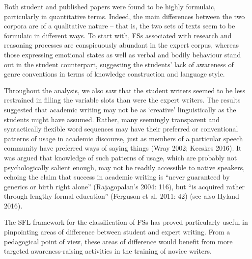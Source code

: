 \begin{styleStandard}
Both student and published papers were found to be highly formulaic, particularly in quantitative terms. Indeed, the main differences between the two corpora are of a qualitative nature – that is, the two sets of texts seem to be formulaic in different ways. To start with, FSs associated with research and reasoning processes are conspicuously abundant in the expert corpus, whereas those expressing emotional states as well as verbal and bodily behaviour stand out in the student counterpart, suggesting the students’ lack of awareness of genre conventions in terms of knowledge construction and language style.
\end{styleStandard}

\begin{styleStandard}
Throughout the analysis, we also saw that the student writers seemed to be less restrained in filling the variable slots than were the expert writers. The results suggested that academic writing may not be as ‘creative’ linguistically as the students might have assumed. Rather, many seemingly transparent and syntactically flexible word sequences may have their preferred or conventional patterns of usage in academic discourse, just as members of a particular speech community have preferred ways of saying things (Wray 2002; Kecskes 2016). It was argued that knowledge of such patterns of usage, which are probably not psychologically salient enough, may not be readily accessible to native speakers, echoing the claim that success in academic writing is “never guaranteed by generics or birth right alone” (Rajagopalan’s 2004: 116), but “is acquired rather through lengthy formal education” (Ferguson et al. 2011: 42) (see also Hyland 2016). 
\end{styleStandard}

\begin{styleStandard}
The SFL framework for the classification of FSs has proved particularly useful in pinpointing areas of difference between student and expert writing. From a pedagogical point of view, these areas of difference would benefit from more targeted awareness-raising activities in the training of novice writers. 
\end{styleStandard}


